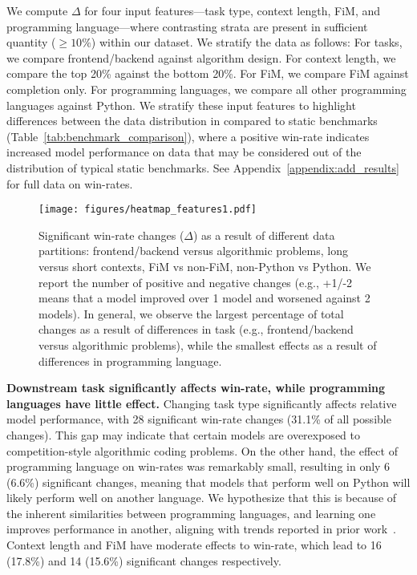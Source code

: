 We compute $\Delta$ for four input features---task type, context length, FiM, and programming language---where contrasting strata are present in sufficient quantity ($\geq10\%$) within our dataset.
We stratify the data as follows:  
For tasks, we compare frontend/backend against algorithm design.
For context length, we compare the top 20\% against the bottom 20\%.
For FiM, we compare FiM against completion only.
For programming languages, we compare all other programming languages against Python.
We stratify these input features to highlight differences between the data distribution in \systemName compared to static benchmarks (Table~\ref{tab:benchmark_comparison}), where a positive win-rate indicates increased model performance on data that may be considered out of the distribution of typical static benchmarks.
See Appendix~\ref{appendix:add_results} for full data on win-rates.




\begin{figure}[t]
    \centering
    \texttt{[image: figures/heatmap\_features1.pdf]}
    \caption{
    Significant win-rate changes ($\Delta$) as a result of different data partitions: frontend/backend versus algorithmic problems, long versus short contexts, FiM vs non-FiM, non-Python vs Python.
    We report the number of positive and negative changes (e.g., +1/-2 means that a model improved over 1 model and worsened against 2 models).
    In general, we observe the largest percentage of total changes as a result of differences in task (e.g., frontend/backend versus algorithmic problems), while the smallest effects as a result of differences in programming language.}
    \label{fig:winrate}
\end{figure}


\textbf{Downstream task significantly affects win-rate, while programming languages have little effect.} 
Changing task type significantly affects relative model performance, with 28 significant win-rate changes (31.1\% of all possible changes).
This gap may indicate that certain models are overexposed to competition-style algorithmic coding problems.
On the other hand, the effect of programming language on win-rates was remarkably small, resulting in only 6 (6.6\%) significant changes, meaning that models that perform well on Python will likely perform well on another language.
We hypothesize that this is because of the inherent similarities between programming languages, and learning one improves performance in another, aligning with trends reported in prior work~\cite{peng2024humaneval}.
Context length and FiM have moderate effects to win-rate, which lead to 16 (17.8\%) and 14 (15.6\%) significant changes respectively.



